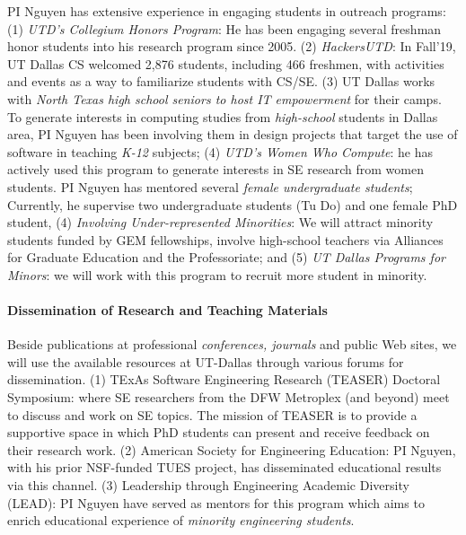 PI Nguyen has extensive experience in engaging students in
outreach programs: (1) {\em UTD's Collegium Honors Program}: He
has been engaging several freshman honor students into his research
program since 2005. (2) {\em HackersUTD}: In Fall'19, UT Dallas CS
welcomed 2,876 students, including 466 freshmen, with activities and
events as a way to familiarize students with CS/SE.
%
(3) UT Dallas works with {\em North Texas high school seniors to host
IT empowerment} for their camps. To generate interests in computing
studies from {\em high-school} students in Dallas area, PI Nguyen has
been involving them in design projects that target the use of software
in teaching {\em K-12} subjects; (4) {\em UTD's Women Who Compute}: he
has actively used this program to generate interests in SE research
from women students. PI Nguyen has mentored several {\em female
undergraduate students}; Currently, he supervise two undergraduate
students (Tu Do) and one female PhD student, (4) {\em Involving
Under-represented Minorities}: We will attract minority students
funded by GEM fellowships, involve high-school teachers via Alliances
for Graduate Education and the Professoriate; and (5) {\em UT Dallas
Programs for Minors}: we will work with this program to recruit more
student in minority.


\paragraph{Dissemination of Research and Teaching Materials}

Beside publications at professional \emph{conferences, journals} and
public Web sites, we will use the available resources at UT-Dallas
through various forums for dissemination.
%
(1) TExAs Software Engineering Research (TEASER) Doctoral Symposium:
where SE researchers from the DFW Metroplex (and beyond) meet to
discuss and work on SE topics.  The mission of TEASER is to provide a
supportive space in which PhD students can present and receive
feedback on their research work.
(2) American Society for Engineering Education:
PI Nguyen, with his prior NSF-funded TUES project, has disseminated
educational results via this channel.
(3) Leadership through Engineering Academic Diversity (LEAD): PI
Nguyen have served as mentors for this program which aims to enrich
educational experience of {\em minority engineering students}.

